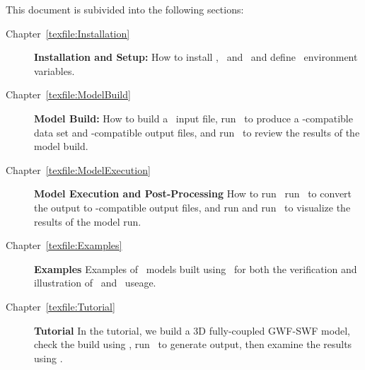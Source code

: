 This document is subivided into the following sections:
\begin{description}
    \item[Chapter~\ref{texfile:Installation}]\textbf{Installation and Setup:} How to install \mut, \mfus\ and \tecplot\ and define \windows\ environment variables.
     \item[Chapter~\ref{texfile:ModelBuild}]\textbf{Model Build:} How to build a \mut\ input file, run \mut\ to produce a \mfus-compatible data set and \tecplot-compatible output files, and run \tecplot\ to review the results of the model build.
    \item[Chapter~\ref{texfile:ModelExecution}]\textbf{Model Execution and Post-Processing} How to run \mfus\, run \mut\ to convert the output to \tecplot-compatible output files, and run and run \tecplot\ to visualize the results of the model run.
    \item[Chapter~\ref{texfile:Examples}]\textbf{Examples} Examples of \mfus\ models built using \mut\ for both the verification and illustration of \mut\ and \mfus\ useage.
    \item[Chapter~\ref{texfile:Tutorial}]\textbf{Tutorial} In the tutorial, we build a 3D fully-coupled GWF-SWF model, check the build using \tecplot, run \mfus\ to generate output, then examine the results using \tecplot.
\end{description} 